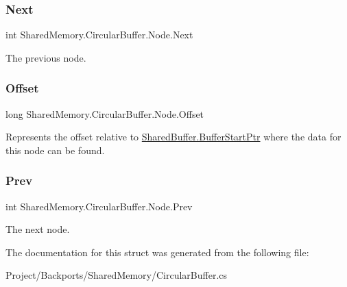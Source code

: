 \subsubsection{\texorpdfstring{Next}{Next}}
{\footnotesize\ttfamily int Shared\+Memory.\+Circular\+Buffer.\+Node.\+Next}



The previous node. 

\mbox{\label{struct_shared_memory_1_1_circular_buffer_1_1_node_aa39234c3ab7451fabfd90bfebf6047cc}} 
\subsubsection{\texorpdfstring{Offset}{Offset}}
{\footnotesize\ttfamily long Shared\+Memory.\+Circular\+Buffer.\+Node.\+Offset}



Represents the offset relative to \hyperlink{class_shared_memory_1_1_shared_buffer_a2332338ba9693ee545a34faa7c64483a}{Shared\+Buffer.\+Buffer\+Start\+Ptr} where the data for this node can be found. 

\mbox{\label{struct_shared_memory_1_1_circular_buffer_1_1_node_a9ccf25ec0824c8c98c15783889296f01}} 
\subsubsection{\texorpdfstring{Prev}{Prev}}
{\footnotesize\ttfamily int Shared\+Memory.\+Circular\+Buffer.\+Node.\+Prev}



The next node. 



The documentation for this struct was generated from the following file\+:\begin{DoxyCompactItemize}
\item 
Project/\+Backports/\+Shared\+Memory/Circular\+Buffer.\+cs\end{DoxyCompactItemize}
